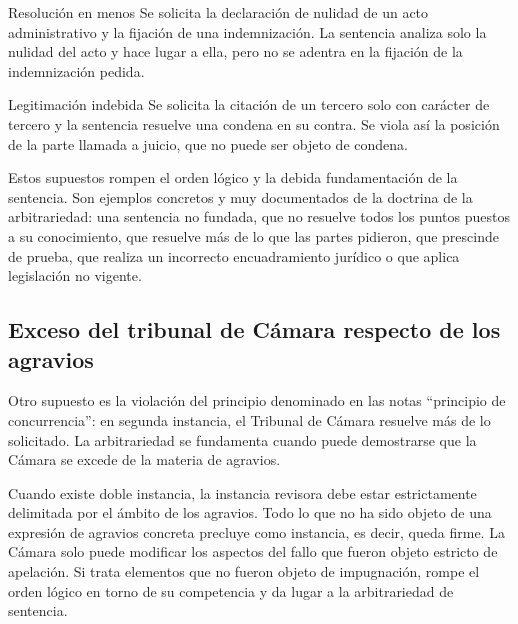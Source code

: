 \documentclass[12pt,oneside]{book}
\begin{document}
\begin{example}{Resolución en menos}
Se solicita la declaración de nulidad de un acto administrativo y la fijación de una indemnización. La sentencia analiza solo la nulidad del acto y hace lugar a ella, pero no se adentra en la fijación de la indemnización pedida.
\end{example}

\begin{example}{Legitimación indebida}
Se solicita la citación de un tercero solo con carácter de tercero y la sentencia resuelve una condena en su contra. Se viola así la posición de la parte llamada a juicio, que no puede ser objeto de condena.
\end{example}

Estos supuestos rompen el orden lógico y la debida fundamentación de la sentencia. Son ejemplos concretos y muy documentados de la doctrina de la arbitrariedad: una sentencia no fundada, que no resuelve todos los puntos puestos a su conocimiento, que resuelve más de lo que las partes pidieron, que prescinde de prueba, que realiza un incorrecto encuadramiento jurídico o que aplica legislación no vigente.

\subsection{Exceso del tribunal de Cámara respecto de los agravios}

Otro supuesto es la violación del principio denominado en las notas ``principio de concurrencia'': en segunda instancia, el Tribunal de Cámara resuelve más de lo solicitado. La arbitrariedad se fundamenta cuando puede demostrarse que la Cámara se excede de la materia de agravios.

\begin{important}
Cuando existe doble instancia, la instancia revisora debe estar estrictamente delimitada por el ámbito de los agravios. Todo lo que no ha sido objeto de una expresión de agravios concreta precluye como instancia, es decir, queda firme. La Cámara solo puede modificar los aspectos del fallo que fueron objeto estricto de apelación. Si trata elementos que no fueron objeto de impugnación, rompe el orden lógico en torno de su competencia y da lugar a la arbitrariedad de sentencia.
\end{important}
\end{document}
